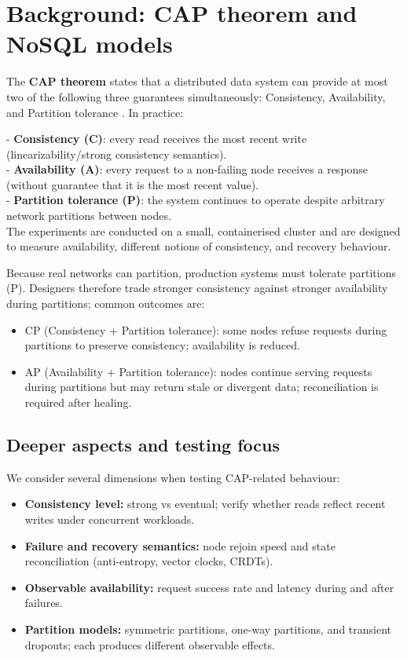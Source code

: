 \documentclass{article}
\begin{document}
\section{Background: CAP theorem and NoSQL models}
The \textbf{CAP theorem} states that a distributed data system can provide at most two of the following %
three guarantees simultaneously: Consistency, Availability, and Partition tolerance \cite{Brewer2000}.
In practice:


- \textbf{Consistency (C)}: every read receives the most recent write %
(linearizability/strong consistency semantics). \\

- \textbf{Availability (A)}: every request to a non-failing node receives %
a response (without guarantee that it is the most recent value). \\

- \textbf{Partition tolerance (P)}: the system continues to operate despite %
arbitrary network partitions between nodes. \\

The experiments are conducted on a small, containerised cluster and are designed to measure availability, different notions of consistency, and recovery behaviour.

Because real networks can partition, production systems must tolerate partitions (P). Designers therefore trade stronger consistency against stronger availability during partitions; common outcomes are:

\begin{itemize}
    \item CP (Consistency + Partition tolerance): some nodes refuse requests during partitions to preserve consistency; availability is reduced.
    \item AP (Availability + Partition tolerance): nodes continue serving requests during partitions but may return stale or divergent data; reconciliation is required after healing.
\end{itemize}

\subsection{Deeper aspects and testing focus}
We consider several dimensions when testing CAP-related behaviour:
\begin{itemize}
    \item \textbf{Consistency level:} strong vs eventual; verify whether reads reflect recent writes under concurrent workloads.
    \item \textbf{Failure and recovery semantics:} node rejoin speed and state reconciliation (anti-entropy, vector clocks, CRDTs).
    \item \textbf{Observable availability:} request success rate and latency during and after failures.
    \item \textbf{Partition models:} symmetric partitions, one-way partitions, and transient dropouts; each produces different observable effects.
\end{itemize}
\end{document}
